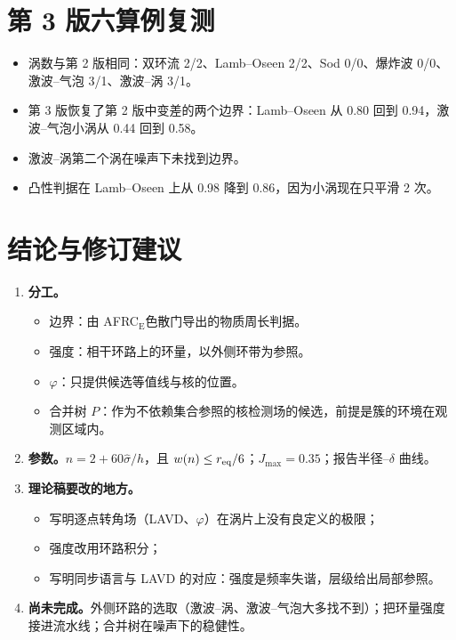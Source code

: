 \documentclass[10.5pt,a4paper]{article}
\newcommand{\AFE}{AFRC$_{\mathrm E}$}
\newcommand{\keyp}[1]{\textbf{\sffamily #1}}
\theoremstyle{definition}
\theoremstyle{plain}
\theoremstyle{remark}
\begin{document}
\section{第 3 版六算例复测}
\begin{table}[H]\centering\small\caption{持续性核数与“涡”数（$J_{\max}=0.35$）。}\resizebox{\linewidth}{!}{}\end{table}
\begin{table}[H]\centering\small\caption{周长判据边界的噪声 IoU（与干净边界相比），三个版本。}\end{table}
\begin{itemize}
\item 涡数与第 2 版相同：双环流 2/2、Lamb–Oseen 2/2、Sod 0/0、爆炸波 0/0、激波–气泡 3/1、激波–涡 3/1。
\item 第 3 版恢复了第 2 版中变差的两个边界：Lamb–Oseen 从 0.80 回到 0.94，激波–气泡小涡从 0.44 回到 0.58。
\item 激波–涡第二个涡在噪声下未找到边界。
\item 凸性判据在 Lamb–Oseen 上从 0.98 降到 0.86，因为小涡现在只平滑 2 次。
\end{itemize}

\section{结论与修订建议}
\begin{enumerate}
\item \keyp{分工。}
  \begin{itemize}[leftmargin=1.2em]
  \item 边界：由 \AFE 色散门导出的物质周长判据。
  \item 强度：相干环路上的环量，以外侧环带为参照。
  \item $\varphi$：只提供候选等值线与核的位置。
  \item 合并树 $P$：作为不依赖集合参照的核检测场的候选，前提是簇的环境在观测区域内。
  \end{itemize}
\item \keyp{参数。}$n=2+60\hat\sigma/h$，且 $w(n)\le r_{\rm eq}/6$；$J_{\max}=0.35$；报告半径–$\delta$ 曲线。
\item \keyp{理论稿要改的地方。}
  \begin{itemize}[leftmargin=1.2em]
  \item 写明逐点转角场（LAVD、$\varphi$）在涡片上没有良定义的极限；
  \item 强度改用环路积分；
  \item 写明同步语言与 LAVD 的对应：强度是频率失谐，层级给出局部参照。
  \end{itemize}
\item \keyp{尚未完成。}外侧环路的选取（激波–涡、激波–气泡大多找不到）；把环量强度接进流水线；合并树在噪声下的稳健性。
\end{enumerate}
\end{document}
